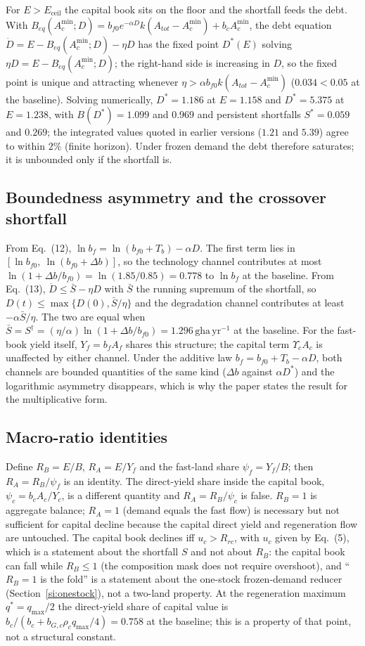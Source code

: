 \documentclass[11pt,a4paper]{article}
\newcommand{\Ups}{\Upsilon_c}
\newcommand{\Eceil}{E_{\mathrm{ceil}}}
\newcommand{\Acmin}{A_c^{\min}}
\begin{document}
For $E>\Eceil$ the capital book sits on the floor and the shortfall feeds the debt. With $B_{eq}(\Acmin;D)=b_{f0}e^{-\alpha D}k(A_{tot}-\Acmin)+b_c\Acmin$, the debt equation $\dot D=E-B_{eq}(\Acmin;D)-\eta D$ has the fixed point $D^*(E)$ solving $\eta D=E-B_{eq}(\Acmin;D)$; the right-hand side is increasing in $D$, so the fixed point is unique and attracting whenever $\eta>\alpha b_{f0}k(A_{tot}-\Acmin)$ ($0.034<0.05$ at the baseline). Solving numerically, $D^*=1.186$ at $E=1.158$ and $D^*=5.375$ at $E=1.238$, with $B(D^*)=1.099$ and $0.969$ and persistent shortfalls $S^*=0.059$ and $0.269$; the integrated values quoted in earlier versions ($1.21$ and $5.39$) agree to within $2\%$ (finite horizon). Under frozen demand the debt therefore saturates; it is unbounded only if the shortfall is.

\subsection{Boundedness asymmetry and the crossover shortfall}\label{si:bounded}

From Eq.~(12), $\ln b_f=\ln(b_{f0}+T_b)-\alpha D$. The first term lies in $[\ln b_{f0},\ \ln(b_{f0}+\Delta b)]$, so the technology channel contributes at most $\ln(1+\Delta b/b_{f0})=\ln(1.85/0.85)=0.778$ to $\ln b_f$ at the baseline. From Eq.~(13), $\dot D\le\bar S-\eta D$ with $\bar S$ the running supremum of the shortfall, so $D(t)\le\max\{D(0),\bar S/\eta\}$ and the degradation channel contributes at least $-\alpha\bar S/\eta$. The two are equal when $\bar S=S^\dagger=(\eta/\alpha)\ln(1+\Delta b/b_{f0})=1.296\,\mathrm{gha\,yr^{-1}}$ at the baseline. For the fast-book yield itself, $Y_f=b_fA_f$ shares this structure; the capital term $\Ups A_c$ is unaffected by either channel. Under the additive law $b_f=b_{f0}+T_b-\alpha D$, both channels are bounded quantities of the same kind ($\Delta b$ against $\alpha D^*$) and the logarithmic asymmetry disappears, which is why the paper states the result for the multiplicative form.

\subsection{Macro-ratio identities}\label{si:ratios}

Define $R_B=E/B$, $R_A=E/Y_f$ and the fast-land share $\psi_f=Y_f/B$; then $R_A=R_B/\psi_f$ is an identity. The direct-yield share inside the capital book, $\psi_c=b_cA_c/Y_c$, is a different quantity and $R_A=R_B/\psi_c$ is false. $R_B=1$ is aggregate balance; $R_A=1$ (demand equals the fast flow) is necessary but not sufficient for capital decline because the capital direct yield and regeneration flow are untouched. The capital book declines iff $u_c>R_{rc}$, with $u_c$ given by Eq.~(5), which is a statement about the shortfall $S$ and not about $R_B$: the capital book can fall while $R_B\le1$ (the composition mask does not require overshoot), and ``$R_B=1$ is the fold'' is a statement about the one-stock frozen-demand reducer (Section~\ref{si:onestock}), not a two-land property. At the regeneration maximum $q^*=q_{\max}/2$ the direct-yield share of capital value is $b_c/(b_c+b_{G,c}\rho_cq_{\max}/4)=0.758$ at the baseline; this is a property of that point, not a structural constant.
\end{document}

